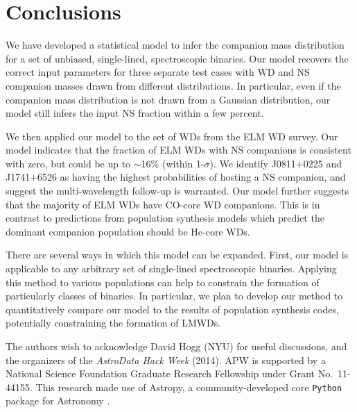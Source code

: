 \documentclass[apjl]{emulateapj}
\begin{document}
\section{Conclusions}

We have developed a statistical model to infer the companion mass distribution for a set of unbiased, single-lined, spectroscopic binaries. Our model recovers the correct input parameters for three separate test cases with WD and NS companion masses drawn from different distributions. In particular, even if the companion mass distribution is not drawn from a Gaussian distribution, our model still infers the input NS fraction within a few percent.

We then applied our model to the set of WDs from the ELM WD survey. Our model indicates that the fraction of ELM WDs with NS companions is consistent with zero, but could be up to $\sim$16\% (within 1-$\sigma$). We identify J0811$+$0225 and J1741$+$6526 as having the highest probabilities of hosting a NS companion, and suggest the multi-wavelength follow-up is warranted. Our model further suggests that the majority of ELM WDs have CO-core WD companions. This is in contrast to predictions from population synthesis models which predict the dominant companion population should be He-core WDs. 

There are several ways in which this model can be expanded. First, our model is applicable to any arbitrary set of single-lined spectroscopic binaries. Applying this method to various populations can help to constrain the formation of particularly classes of binaries. In particular, we plan to develop our method to quantitatively compare our model to the results of population synthesis codes, potentially constraining the formation of LMWDs.



\acknowledgements
The authors wish to acknowledge David Hogg (NYU) for useful discussions, and the organizers of the \emph{AstroData Hack Week} (2014). 
APW is supported by a National Science Foundation Graduate Research Fellowship under Grant No.\ 11-44155. 
This research made use of Astropy, a community-developed core \texttt{Python} package for Astronomy \citep{astropy13}. \\


\end{document}
